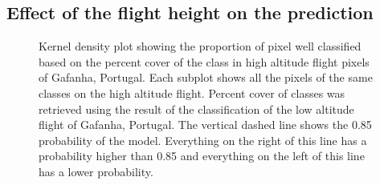 \documentclass[
  number]{elsarticle}
\begin{document}
\subsection{Effect of the flight height on the
prediction}\label{effect-of-the-flight-height-on-the-prediction}

\label{cell-fig-upscaling}
\begin{figure}[H]


\caption{\label{fig-upscaling}Kernel density plot showing the proportion
of pixel well classified based on the percent cover of the class in high
altitude flight pixels of Gafanha, Portugal. Each subplot shows all the
pixels of the same classes on the high altitude flight. Percent cover of
classes was retrieved using the result of the classification of the low
altitude flight of Gafanha, Portugal. The vertical dashed line shows the
0.85 probability of the model. Everything on the right of this line has
a probability higher than 0.85 and everything on the left of this line
has a lower probability.}

\end{figure}%
\end{document}
